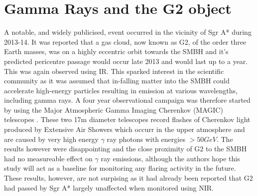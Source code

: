 \documentclass[a4paper,12pt]{article}
\begin{document}
\section{Gamma Rays and the G2 object}
A notable, and widely publicised, event occurred in the vicinity of Sgr A* during 2013-14. It was reported \citep{gillessen2} that a gas cloud, now known as G2, of the order three Earth masses, was on
a highly eccentric orbit towards the SMBH and it's predicted pericentre passage would occur late 2013 and would last up to a year. This was again observed using IR. 
This sparked interest in the scientific community as it was assumed that in-falling matter into the SMBH could accelerate
high-energy particles resulting in emission at various wavelengths, including gamma rays. A four year observational campaign was therefore started by using the Major Atmospheric Gamma Imaging Cherenkov
(MAGIC) telescopes \citep{ahnen}. These two 17m diameter telescopes record flashes of Cherenkov light produced by Extensive Air Showers which occurr in the upper atmosphere and are caused by very
high energy $\gamma$ ray photons with energies $>50GeV$. The results however were disappointing and the close proximity of G2 to the SMBH had no measureable effect on $\gamma$ ray emissions, although
the authors hope this study will act as a baseline for monitoring any flaring activity in the future. These results, however, are not surpising as it had already been reported \citep{ghez} that G2
had passed by Sgr A* largely unaffected when monitored using NIR.
\end{document}

